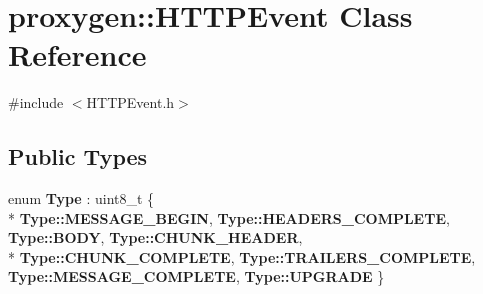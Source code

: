 \section{proxygen\+:\+:H\+T\+T\+P\+Event Class Reference}
\label{classproxygen_1_1HTTPEvent}


{\ttfamily \#include $<$H\+T\+T\+P\+Event.\+h$>$}

\subsection*{Public Types}
\begin{DoxyCompactItemize}
\item 
enum {\bf Type} \+: uint8\+\_\+t \{ \\*
{\bf Type\+::\+M\+E\+S\+S\+A\+G\+E\+\_\+\+B\+E\+G\+IN}, 
{\bf Type\+::\+H\+E\+A\+D\+E\+R\+S\+\_\+\+C\+O\+M\+P\+L\+E\+TE}, 
{\bf Type\+::\+B\+O\+DY}, 
{\bf Type\+::\+C\+H\+U\+N\+K\+\_\+\+H\+E\+A\+D\+ER}, 
\\*
{\bf Type\+::\+C\+H\+U\+N\+K\+\_\+\+C\+O\+M\+P\+L\+E\+TE}, 
{\bf Type\+::\+T\+R\+A\+I\+L\+E\+R\+S\+\_\+\+C\+O\+M\+P\+L\+E\+TE}, 
{\bf Type\+::\+M\+E\+S\+S\+A\+G\+E\+\_\+\+C\+O\+M\+P\+L\+E\+TE}, 
{\bf Type\+::\+U\+P\+G\+R\+A\+DE}
 \}
\end{DoxyCompactItemize}
